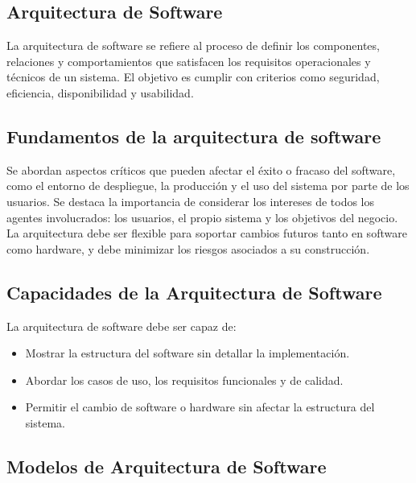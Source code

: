 \begin{center}
    \section{Arquitectura de Software}

    La arquitectura de software se refiere al proceso de definir los componentes, 
    relaciones y comportamientos que satisfacen los requisitos operacionales y técnicos de un sistema.
    El objetivo es cumplir con criterios como seguridad, eficiencia, disponibilidad y usabilidad.

    \subsection{Fundamentos de la arquitectura de software}
    Se abordan aspectos críticos que pueden afectar el éxito o fracaso del software, como el entorno 
    de despliegue, la producción y el uso del sistema por parte de los usuarios.
    Se destaca la importancia de considerar los intereses de todos los agentes involucrados: los usuarios, 
    el propio sistema y los objetivos del negocio.
    La arquitectura debe ser flexible para soportar cambios futuros tanto en software como hardware, 
    y debe minimizar los riesgos asociados a su construcción.

    \subsection{Capacidades de la Arquitectura de Software}
    La arquitectura de software debe ser capaz de:
    \begin{itemize}
        \item Mostrar la estructura del software sin detallar la implementación.
        \item Abordar los casos de uso, los requisitos funcionales y de calidad.
        \item Permitir el cambio de software o hardware sin afectar la estructura del sistema.
    \end{itemize}

    \subsection{Modelos de Arquitectura de Software}


\end{center}
